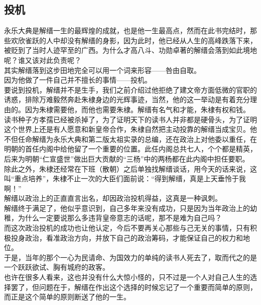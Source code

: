 \begin{multicols}{\theparacolNo}
\subsection{投机}
永乐大典是解缙一生的最辉煌的成就，也是他一生最高点，然而在此书完结时，那些欢欣雀跃的人中却没有解缙的身影，因为此时，他已经从人生的高峰跌落下来，被贬到了当时人迹罕至的广西。为什么才高八斗、功勋卓著的解缙会落到如此境地呢？谁又该对此负责呢？\\

其实解缙落到这步田地完全可以用一个词来形容——咎由自取。\\

因为他做了一件自己并不擅长的事情——投机。\\

要说到投机，解缙并不是生手，我们之前介绍过他拒绝了建文帝方面低微的官职的诱惑，排除万难毅然奔赴朱棣身边的光辉事迹，当然，他的这一举动是有着充分理由的。因为朱棣需要他，而他也需要朱棣。解缙有名气和才能，朱棣有权和钱。\\

读书种子方孝孺已经被杀掉了，为了证明天下的读书人并非都是硬骨头，为了证明这个世界上还是有人愿意和新皇帝合作，朱棣自然把主动投靠的解缙当成宝贝。他不但任命解缙为永乐大典和第二版太祖实录的总编，还在政治上对他委以重任，在明朝的首任内阁中给他留了一个重要的位置。此任内阁总共七人，个个都是精英，后来为明朝“仁宣盛世”做出巨大贡献的“三杨”中的两杨都在此内阁中担任要职。\\

除此之外，朱棣还经常在下班（散朝）之后单独找解缙谈话，用今天的话来说，这叫“重点培养”，朱棣不止一次的大臣们面前说：“得到解缙，真是上天垂怜于我啊！”\\

解缙以政治上的正直直言出名，却因政治投机得益，这真是一种讽刺。\\

解缙终于满足了，他似乎意识到，自己多年来没有成功，只是因为当年政治上的幼稚，为什么一定要说那么多违背皇帝意志的话呢，那不是难为自己吗？\\

而这次政治投机的成功也让他认定，今后不要再关心那些与己无关的事情，只有积极投身政治，看准政治方向，并放下自己的政治筹码，才能保证自己的权力和地位。\\

于是，当年的那个一心为民请命、为国效力的单纯的读书人死去了，取而代之的是一个跃跃欲试、胸有城府的政客。\\

也许在很多人看来，这也并没有什么大惊小怪的，只不过是一个人对自己人生的选择罢了，但问题在于，解缙在作出这个选择的时候忘记了一个重要而简单的原则，而正是这个简单的原则断送了他的一生。\\


\end{multicols}

